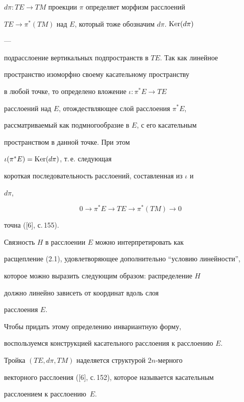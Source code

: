 $d\pi:TE\to TM$ проекции $\pi$ определяет морфизм расслоений 


$TE\to\pi^*(TM)$ над $E$, который тоже обозначим $d\pi$.\; $\operatorname{Ker}(d\pi)$ 


--- 


подрасслоение вертикальных подпространств в $TE$. Так как линейное  


пространство изоморфно своему касательному пространству  


в любой точке, то определено вложение $\iota:\pi^*E\to TE$ 


расслоений над $E$, отождествляющее слой расслоения $\pi^*E$,  


рассматриваемый как подмногообразие в $E$, с его касательным  


пространством в данной точке. При этом 


$\iota(\pi^*E)=\operatorname{Ker}(d\pi)$, т.\,е. следующая  


короткая последовательность расслоений, составленная из $\iota$ и 


$d\pi$, 


\begin{equation} 


0\to\pi^*E\to TE\to\pi^*(TM) \to 0


\end{equation} 


точна ([6], с.\,155). 


 


Связность $H$ в расслоении $E$ можно интерпретировать как 


расщепление (2.1), удовлетворяющее дополнительно ``условию линейности'', 


которое можно выразить следующим образом: распределение $H$ 


должно линейно зависеть от координат вдоль слоя 


расслоения $E$. 


 


Чтобы придать этому определению инвариантную форму, 


воспользуемся конструкцией касательного расслоения к расслоению $E$. 


Тройка $(TE,d\pi,TM)$ наделяется структурой $2n$-мерного 


векторного расслоения ([6], с.\,152), которое называется касательным  


расслоением к расслоению~$E$. 


